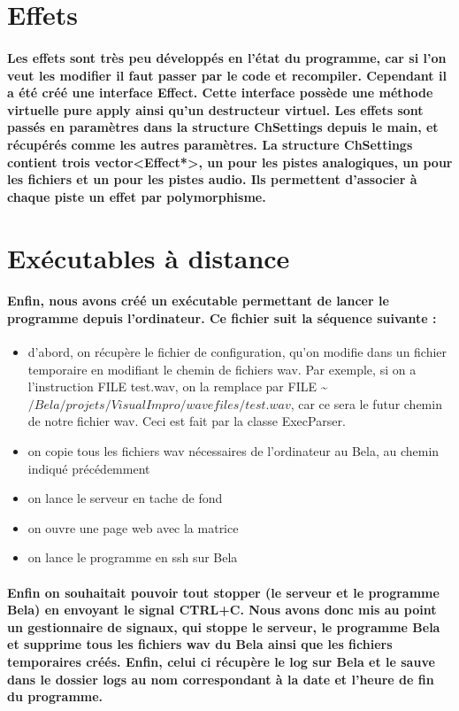 \documentclass[a4paper]{article}
\begin{document}
\section{Effets} \paragraph{Les effets sont très peu développés en l’état du
programme, car si l’on veut les modifier il faut passer par le code et
recompiler. Cependant il a été créé une interface Effect. Cette interface
possède une méthode virtuelle pure apply ainsi qu’un destructeur virtuel. Les
effets sont passés en paramètres dans la structure ChSettings depuis le main, et
récupérés comme les autres paramètres. La structure ChSettings contient trois
vector<Effect*>, un pour les pistes analogiques, un pour les fichiers et un pour
les pistes audio. Ils permettent d’associer à chaque piste un effet par
polymorphisme.}

\section{Exécutables à distance} \paragraph{Enfin, nous avons créé un exécutable
permettant de lancer le programme depuis l’ordinateur. Ce fichier suit la
séquence suivante :}

\begin{itemize} \item d’abord, on récupère le fichier de configuration, qu’on
modifie dans un fichier temporaire en modifiant le chemin de fichiers wav. Par
exemple, si on a l’instruction FILE test.wav, on la remplace par FILE
\textasciitilde $/Bela/projets/VisualImpro/wavefiles/test.wav$, car ce sera le
futur chemin de notre fichier wav. Ceci est fait par la classe ExecParser. \item
on copie tous les fichiers wav nécessaires de l’ordinateur au Bela, au chemin
indiqué précédemment \item on lance le serveur en tache de fond \item on ouvre
une page web avec la matrice \item on lance le programme en ssh sur Bela
\end{itemize}

\paragraph{Enfin on souhaitait pouvoir tout stopper (le serveur et le programme
Bela) en envoyant le signal CTRL+C. Nous avons donc mis au point un gestionnaire
de signaux, qui stoppe le serveur, le programme Bela et supprime tous les
fichiers wav du Bela ainsi que les fichiers temporaires créés. Enfin, celui ci
récupère le log sur Bela et le sauve dans le dossier logs au nom correspondant à
la date et l’heure de fin du programme.}
\end{document}
